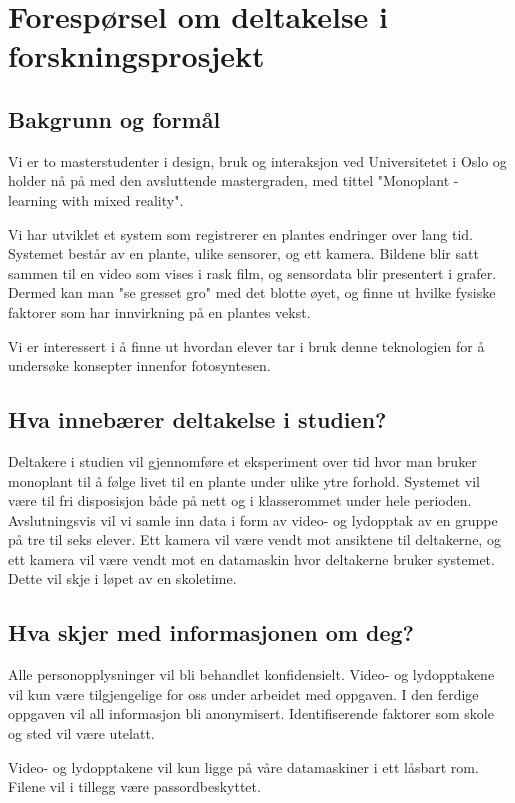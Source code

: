 \documentclass[a4paper,norsk,12pt]{article} %
\begin{document}
\section*{Forespørsel om deltakelse i forskningsprosjekt}

\subsection*{Bakgrunn og formål}
Vi er to masterstudenter i design, bruk og interaksjon ved Universitetet i Oslo og holder nå på med den avsluttende mastergraden, med tittel "Monoplant - learning with mixed reality". 

Vi har utviklet et system som registrerer en plantes endringer over lang tid. Systemet består av en plante, ulike sensorer, og ett kamera. Bildene blir satt sammen til en video som vises i rask film, og sensordata blir presentert i grafer. Dermed kan man "se gresset gro" med det blotte øyet, og finne ut hvilke fysiske faktorer som har innvirkning på en plantes vekst. 

Vi er interessert i å finne ut hvordan elever tar i bruk denne teknologien for å undersøke konsepter innenfor fotosyntesen. 

\subsection*{Hva innebærer deltakelse i studien?}
Deltakere i studien vil gjennomføre et eksperiment over tid hvor man bruker monoplant til å følge livet til en plante under ulike ytre forhold. Systemet vil være til fri disposisjon både på nett og i klasserommet under hele perioden. Avslutningsvis vil vi samle inn data i form av video- og lydopptak av en gruppe på tre til seks elever. Ett kamera vil være vendt mot ansiktene til deltakerne, og ett kamera vil være vendt mot en datamaskin hvor deltakerne bruker systemet. Dette vil skje i løpet av en skoletime. 

\subsection*{Hva skjer med informasjonen om deg?}
Alle personopplysninger vil bli behandlet konfidensielt. Video- og lydopptakene vil kun være tilgjengelige for oss under arbeidet med oppgaven. I den ferdige oppgaven vil all informasjon bli anonymisert. Identifiserende faktorer som skole og sted vil være utelatt. 

Video- og lydopptakene vil kun ligge på våre datamaskiner i ett låsbart rom. Filene vil i tillegg være passordbeskyttet. 
\end{document}
